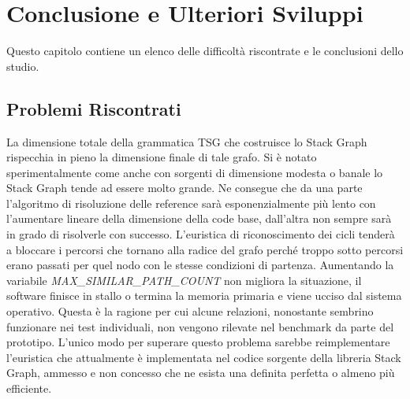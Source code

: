 \chapter{Conclusione e Ulteriori Sviluppi}

Questo capitolo contiene un elenco delle difficolt\`a riscontrate e le conclusioni dello studio.

\section{Problemi Riscontrati}




La dimensione totale della grammatica TSG che costruisce lo Stack Graph rispecchia in pieno la dimensione finale di tale grafo. Si \`e notato sperimentalmente come anche con sorgenti di dimensione modesta o banale lo Stack Graph tende ad essere molto grande. Ne consegue che da una parte l'algoritmo di risoluzione delle reference sar\`a esponenzialmente pi\`u lento con l'aumentare lineare della dimensione della code base, dall'altra non sempre sar\`a in grado di risolverle con successo. L'euristica di riconoscimento dei cicli tender\`a a bloccare i percorsi che tornano alla radice del grafo perch\'e troppo sotto percorsi erano passati per quel nodo con le stesse condizioni di partenza. Aumentando la variabile \emph{MAX\_SIMILAR\_PATH\_COUNT} non migliora la situazione, il software finisce in stallo o termina la memoria primaria e viene ucciso dal sistema operativo. Questa \`e la ragione per cui alcune relazioni, nonostante sembrino funzionare nei test individuali, non vengono rilevate nel benchmark da parte del prototipo. L'unico modo per superare questo problema sarebbe reimplementare l'euristica che attualmente \`e implementata nel codice sorgente della libreria Stack Graph, ammesso e non concesso che ne esista una definita perfetta o almeno pi\`u efficiente.

